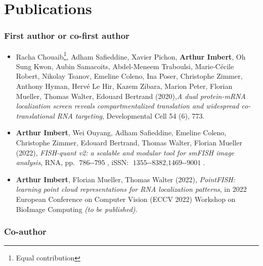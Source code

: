 \section{Publications}
\label{sec:conclusion_publications}

\subsubsection{First author or co-first author}

\begin{itemize}
	\item Racha Chouaib\footnote{Equal contribution}, Adham Safieddine\footnotemark[1], Xavier Pichon\footnotemark[1], \textbf{Arthur Imbert\footnotemark[1]}, Oh Sung Kwon, Aubin Samacoits, Abdel-Meneem Traboulsi, Marie-Cécile Robert, Nikolay Tsanov, Emeline Coleno, Ina Poser, Christophe Zimmer, Anthony Hyman, Hervé Le Hir, Kazem Zibara, Marion Peter, Florian Mueller, Thomas Walter, Edouard Bertrand (2020),\textit{A dual protein-mRNA localization screen reveals compartmentalized translation and widespread co-translational RNA targeting}, Developmental Cell 54 (6), 773.
	\item \textbf{Arthur Imbert}, Wei Ouyang, Adham Safieddine, Emeline Coleno, Christophe Zimmer, Edouard Bertrand, Thomas Walter, Florian Mueller (2022), \textit{FISH-quant v2: a scalable and modular tool for smFISH image analysis}, RNA, pp. $\operatorname{786--795}$, iSSN: $\operatorname{1355--8382, 1469--9001}$.
	\item \textbf{Arthur Imbert}, Florian Mueller, Thomas Walter (2022), \textit{PointFISH: learning point cloud representations for RNA localization patterns}, in 2022 European Conference on Computer Vision (ECCV 2022) Workshop on BioImage Computing \textit{(to be published)}.
\end{itemize}

\subsubsection{Co-author}

